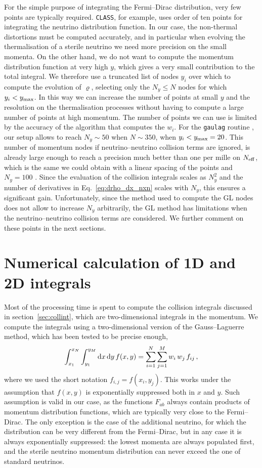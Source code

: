\documentclass[notitlepage,nofootinbib,showpacs,preprintnumbers,amsmath,amssymb,superscriptaddress,prd,onecolumn]{revtex4-1}
\newcommand{\Neff}{\ensuremath{N_{\rm eff}}}
\begin{document}
For the simple purpose of integrating the Fermi--Dirac distribution, very few points are typically required.
\texttt{CLASS}, for example, uses order of ten points for integrating the neutrino distribution function.
In our case, the non-thermal distortions must be computed accurately, and in particular
when evolving the thermalisation of a sterile neutrino we need more precision on the small momenta.
On the other hand, we do not want to compute the momentum distribution function at very high $y$,
which gives a very small contribution to the total integral.
We therefore use a truncated list of nodes $y_i$ over which to compute the evolution of $\varrho$,
selecting only the $N_y\leq N$ nodes for which $y_i<y_{\rm max}$.
In this way we can increase the number of points at small $y$ and the resolution on the thermalisation processes
without having to compute a large number of points at high momentum.
The number of points we can use is limited by the accuracy of the algorithm that computes the $w_i$.
For the \texttt{gaulag} routine \cite{NR}, our setup allows to reach $N_y\sim50$ when $N\sim350$,
when $y_i<y_{\rm max}=20$.
This number of momentum nodes
if neutrino--neutrino collision terms are ignored,
is already large enough to reach a precision
much better than one per mille on \Neff,
which is the same we could obtain with a linear spacing of the points
and $N_y=100$ \cite{deSalas:2016ztq}.
Since the evaluation of the collision integrals scales as $N_y^2$
and the number of derivatives in Eq.~\eqref{eq:drho_dx_nxn} scales with $N_y$,
this ensures a significant gain.
Unfortunately, since the method used to compute the GL nodes does not allow to increase $N_y$ arbitrarily,
the GL method has limitations when the neutrino--neutrino collision terms are considered.
We further comment on these points in the next sections.


\section{Numerical calculation of 1D and 2D integrals}
\label{ssec:integrals}
Most of the processing time is spent to compute the collision integrals
discussed in section~\ref{sec:collint}, which are two-dimensional integrals in the momentum.
We compute the integrals using a two-dimensional version of the Gauss--Laguerre method,
which has been tested to be precise enough,
%
\begin{equation}
\int_{x_1}^{x_N}\int_{y_1}^{y_M}{\rm d}x\, \mathrm{d}y\, f(x, y)
=
\sum_{i=1}^{N}\sum_{j=1}^{M}
w_i\,w_j\,f_{ij}
\,,
\end{equation}
where we used the short notation $f_{i,j} = f(x_i,y_j)$.
This works under the assumption that $f(x,y)$ is exponentially suppressed both in $x$ and $y$.
Such assumption is valid in our case, as the functions $F_{ab}$ always contain products of momentum distribution functions,
which are typically very close to the Fermi--Dirac.
The only exception is the case of the additional neutrino, for which the distribution can be very different from the Fermi--Dirac,
but in any case it is always exponentially suppressed:
the lowest momenta are always populated first,
and the sterile neutrino momentum distribution can never exceed the one of standard neutrinos.
\end{document}
